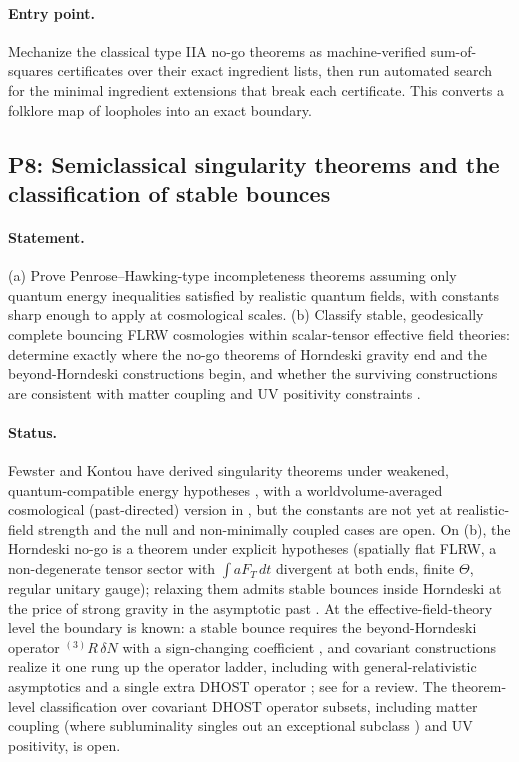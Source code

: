 \documentclass[11pt,letterpaper]{article}
\begin{document}
\paragraph{Entry point.} Mechanize the classical type IIA no-go theorems as machine-verified sum-of-squares certificates over their exact ingredient lists, then run automated search for the minimal ingredient extensions that break each certificate. This converts a folklore map of loopholes into an exact boundary.

\subsection{P8: Semiclassical singularity theorems and the classification of stable bounces}
\label{sec:p8}

\paragraph{Statement.} (a) Prove Penrose--Hawking-type incompleteness theorems \cite{penrose1965,hawkingpenrose1970} assuming only quantum energy inequalities satisfied by realistic quantum fields, with constants sharp enough to apply at cosmological scales. (b) Classify stable, geodesically complete bouncing FLRW cosmologies within scalar-tensor effective field theories: determine exactly where the no-go theorems of Horndeski gravity \cite{kobayashi2016,lmr2016} end and the beyond-Horndeski constructions \cite{creminelli2016} begin, and whether the surviving constructions are consistent with matter coupling and UV positivity constraints \cite{adams2006,rubakov2014}.

\paragraph{Status.} Fewster and Kontou have derived singularity theorems under weakened, quantum-compatible energy hypotheses \cite{fewsterkontou2020,fewsterkontou2022}, with a worldvolume-averaged cosmological (past-directed) version in \cite{gkos2024}, but the constants are not yet at realistic-field strength and the null and non-minimally coupled cases are open. On (b), the Horndeski no-go is a theorem under explicit hypotheses (spatially flat FLRW, a non-degenerate tensor sector with $\int aF_T\,dt$ divergent at both ends, finite $\Theta$, regular unitary gauge); relaxing them admits stable bounces inside Horndeski at the price of strong gravity in the asymptotic past \cite{ageeva2021}. At the effective-field-theory level the boundary is known: a stable bounce requires the beyond-Horndeski operator ${}^{(3)}\!R\,\delta N$ with a sign-changing coefficient \cite{creminelli2016}, and covariant constructions realize it one rung up the operator ladder, including with general-relativistic asymptotics and a single extra DHOST operator \cite{yepiao2019}; see \cite{mironovvolkova2024} for a review. The theorem-level classification over covariant DHOST operator subsets, including matter coupling (where subluminality singles out an exceptional subclass \cite{mrv2020,an2025}) and UV positivity, is open.
\end{document}
